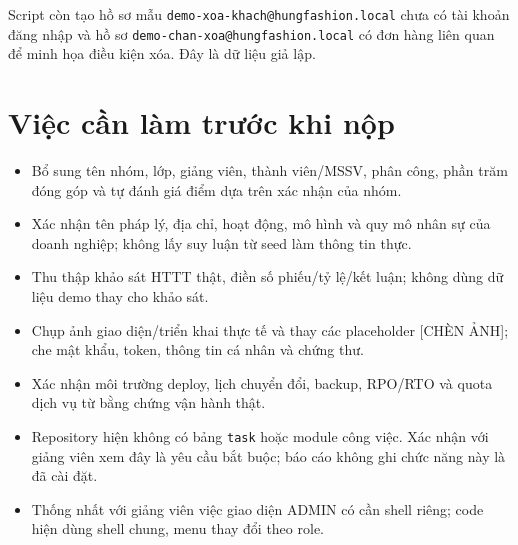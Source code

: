 Script còn tạo hồ sơ mẫu \texttt{demo-xoa-khach@hungfashion.local} chưa có tài khoản đăng nhập và hồ sơ \texttt{demo-chan-xoa@hungfashion.local} có đơn hàng liên quan để minh họa điều kiện xóa. Đây là dữ liệu giả lập.

\section{Việc cần làm trước khi nộp}
\begin{itemize}
\item Bổ sung tên nhóm, lớp, giảng viên, thành viên/MSSV, phân công, phần trăm đóng góp và tự đánh giá điểm dựa trên xác nhận của nhóm.
\item Xác nhận tên pháp lý, địa chỉ, hoạt động, mô hình và quy mô nhân sự của doanh nghiệp; không lấy suy luận từ seed làm thông tin thực.
\item Thu thập khảo sát HTTT thật, điền số phiếu/tỷ lệ/kết luận; không dùng dữ liệu demo thay cho khảo sát.
\item Chụp ảnh giao diện/triển khai thực tế và thay các placeholder [CHÈN ẢNH]; che mật khẩu, token, thông tin cá nhân và chứng thư.
\item Xác nhận môi trường deploy, lịch chuyển đổi, backup, RPO/RTO và quota dịch vụ từ bằng chứng vận hành thật.
\item Repository hiện không có bảng \texttt{task} hoặc module công việc. Xác nhận với giảng viên xem đây là yêu cầu bắt buộc; báo cáo không ghi chức năng này là đã cài đặt.
\item Thống nhất với giảng viên việc giao diện ADMIN có cần shell riêng; code hiện dùng shell chung, menu thay đổi theo role.
\end{itemize}

